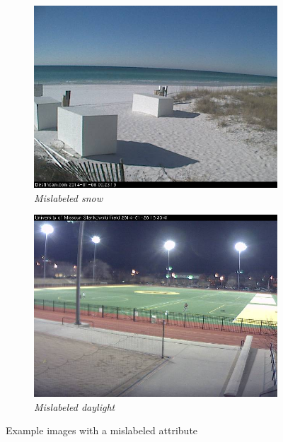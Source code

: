\documentclass[10pt,twocolumn,letterpaper]{article}
\begin{document}
\begin{figure}
	\centering
  \begin{subfigure}[b]{0.49\columnwidth}
    \centering
		\includegraphics[width=\columnwidth]{figs/ex_bad_ims/snow_bad_1.jpg}
    \caption{\emph{Mislabeled \emph{snow}}}
    \label{fig:ex_bad_snow}
	\end{subfigure}	
  \begin{subfigure}[b]{0.49\columnwidth}
    \centering
		\includegraphics[width=\columnwidth]{figs/ex_bad_ims/daylight_bad_1.jpg}
    \caption{\emph{Mislabeled \emph{daylight}}}
    \label{fig:ex_bad_daylight}
	\end{subfigure}	
	\caption{Example images with a mislabeled attribute}
	\label{fig:ex_bad}
\end{figure}
\end{document}
